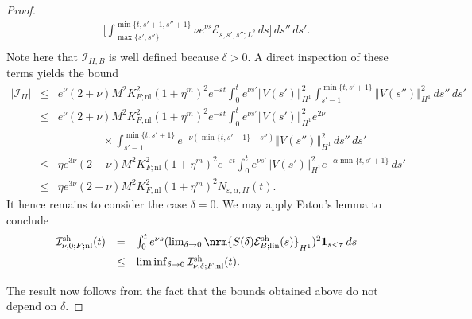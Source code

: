 \documentclass[10pt]{articleHJ}
\newcommand{\e}{\ensuremath{\varepsilon}}
\renewcommand{\d}{\ensuremath{\delta}}
\DeclarePairedDelimiter{\nrm}\lVert\rVert
\newcommand{\abs}[1]{\left\vert#1\right\vert}			%
\newcommand{\norm}[1]{\left\Vert#1\right\Vert}		%
\numberwithin{equation}{section}
\begin{document}
\begin{proof}
\begin{equation}
\begin{array}{lcl}
 \Big[\int_{\max\{s',s''\}}^{\min\{ t,s'+1, s''+1 \} }
                      \nu e^{\nu s}
    \mathcal{E}_{s,s',s'';L^2}    \, ds
                   \Big]        \, ds '' \, ds'  .
 \\[0.2cm]
\end{array}
\end{equation} Note here that $\mathcal{I}_{II;B}$ is well defined because $\delta>0$. 
A direct inspection of these terms yields the bound
\begin{equation}
\begin{array}{lcl}
\abs{\mathcal{I}_{II} }
& \le &
  e^{ \nu} (2 + \nu)
  M^2 K_{F;\mathrm{nl}}^2 (1 + \eta^m)^2
     e^{-\e t}
    \int_0^{t }
       e^{\nu s'}
        \norm{V(s')}_{H^1}^2
       \int_{s'-1}^{\min\{t, s'+1 \} }
         \norm{V(s'')}_{H^1}^2 \, ds'' \, d s'
\\[0.2cm]
& \le &
  e^{ \nu} (2 + \nu)
  M^2 K_{F;\mathrm{nl}}^2 (1 + \eta^m)^2
     e^{-\e t}
    \int_0^{t }
       e^{\nu s'} \norm{V(s')}_{H^1}^2
       e^{2 \nu}
    \\[0.2cm]
    & & \qquad \qquad \times
       \int_{s'-1}^{\min\{t, s'+1 \} }
          e^{-\nu(\min\{t,s'+1\} - s'')} \norm{V(s'')}_{H^1}^2 \, ds'' \, d s'
\\[0.2cm]
& \le &
  \eta e^{3 \nu} (2 + \nu)
  M^2 K_{F;\mathrm{nl}}^2 (1 + \eta^m)^2
     e^{-\e t}
     \int_0^{t }
       e^{\nu s'} \norm{V(s')}_{H^1}^2
       e^{-\alpha \min\{t, s'+1\} }
        \, d s'
\\[0.2cm]
& \le &
\eta e^{3 \nu} (2 + \nu)
  M^2 K_{F;\mathrm{nl}}^2 (1 + \eta^m)^2
  N_{\e,\alpha;II}(t).
\end{array}
\end{equation}
It hence remains to consider the case $\delta = 0$.
We may apply Fatou's lemma
to conclude
\begin{equation}
\begin{array}{lcl}
\mathcal{I}^{\mathrm{sh}}_{\nu,0;F;\mathrm{nl}} (t)
& = &
  \int_0^{t}
e^{\nu s}
(\lim_{\d\to0}\nrm{S(\d)
  \mathcal{E}^{\mathrm{sh}}_{B;\mathrm{lin}}(s) }_{H^1})^2
    \mathbf{1}_{s < \tau} \, ds
\\[0.2cm]
&\leq & \liminf_{\d\to0}
   \mathcal{I}^{\mathrm{sh}}_{\nu,\delta;F;\mathrm{nl}} (t).
\\[0.2cm]
\end{array}
\end{equation}
The result now follows from the fact that
the bounds obtained above do not depend on  $\delta$.
\end{proof}
\end{document}
